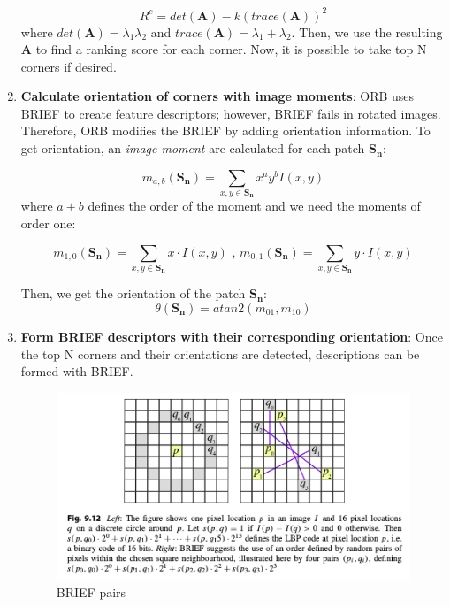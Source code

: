 \documentclass[a4paper]{report}
\numberwithin{figure}{section}
\begin{document}
\begin{enumerate}
    \begin{equation}
      R^c = det(\mathbf{A}) - k(trace(\mathbf{A}))^2
    \end{equation}
    where $det(\mathbf{A}) = \lambda_1 \lambda_2$ and 
    $trace(\mathbf{A}) = \lambda_1 + \lambda_2$.
    Then, we use the resulting $\mathbf{A}$ to find a ranking score for each 
    corner. Now, it is possible to take top N corners if desired.

  \item \textbf{Calculate orientation of corners with image moments}: 
    ORB uses BRIEF to create feature descriptors; however, BRIEF fails in 
    rotated images. Therefore, ORB modifies the BRIEF by adding orientation 
    information. To get orientation, an \textit{image moment} are calculated
    for each patch $\mathbf{S_n}$:

    \begin{equation}
      m_{a,b}(\mathbf{S_n}) = \sum_{x,y \in \mathbf{S_n}} x^a y^b I(x,y)
    \end{equation}
    where $a + b$ defines the order of the moment and we need 
    the moments of order one:

    \begin{equation}
      m_{1,0}(\mathbf{S_n}) = \sum_{x,y \in \mathbf{S_n}} x \cdot I(x,y) \text{  ,  }
      m_{0,1}(\mathbf{S_n}) = \sum_{x,y \in \mathbf{S_n}} y \cdot I(x,y)
    \end{equation}

    Then, we get the orientation of the patch $\mathbf{S_n}$:
    \begin{equation}
      \theta(\mathbf{S_n}) = atan2(m_{01}, m_{10})
    \end{equation}

  \item \textbf{Form BRIEF descriptors with their corresponding orientation}:
    Once the top N corners and their orientations are detected, descriptions 
    can be formed with BRIEF. 

\begin{figure}[H]
	\centering
  \includegraphics[width=\linewidth,natwidth=640,natheight=640]
  {fig/ref_imgs/brief.png}
  \caption{BRIEF pairs}
  \label{fig:brief_pairs}
\end{figure}



\end{enumerate}
\end{document}
